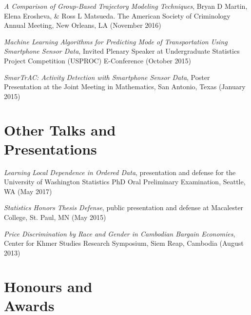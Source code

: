 \documentclass[margin,centered]{res}
\begin{document}
\begin{resume}
\emph{A Comparison of Group-Based Trajectory Modeling Techniques}, Bryan D Martin, Elena Erosheva, \& Ross L Matsueda. The American Society of Criminology Annual Meeting, New Orleans, LA (November 2016)

\emph{Machine Learning Algorithms for Predicting Mode of Transportation Using Smartphone Sensor Data}, Invited Plenary Speaker at Undergraduate Statistics Project Competition (USPROC) E-Conference (October 2015)

\emph{SmarTrAC: Activity Detection with Smartphone Sensor Data}, Poster Presentation at the Joint Meeting in Mathematics, San Antonio, Texas (January 2015)


\section{\sc Other Talks and \\ Presentations}


\emph{Learning Local Dependence in Ordered Data}, presentation and defense for the University of Washington Statistics PhD Oral Preliminary Examination, Seattle, WA (May 2017)

\emph{Statistics Honors Thesis Defense}, public presentation and defense at Macalester College, St. Paul, MN (May 2015)



\emph{Price Discrimination by Race and Gender in Cambodian Bargain Economies}, Center for Khmer Studies Research Symposium, Siem Reap, Cambodia (August 2013)



\section{\sc Honours and\\ Awards}


\end{resume}
\end{document}
